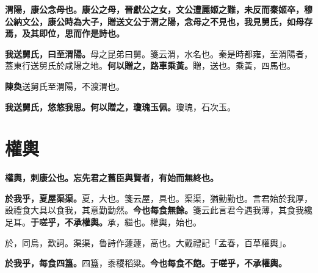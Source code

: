 
\textbf{渭陽，康公念母也。康公之母，晉獻公之女，文公遭麗姬之難，未反而秦姬卒，穆公納文公，康公時為大子，贈送文公于渭之陽，念母之不見也，我見舅氏，如母存焉，及其即位，思而作是詩也。}

\textbf{我送舅氏，曰至渭陽。}{\footnotesize 母之昆弟曰舅。箋云渭，水名也。秦是時都雍，至渭陽者，蓋東行送舅氏於咸陽之地。}\textbf{何以贈之，路車乘黃。}{\footnotesize 贈，送也。乘黃，四馬也。}

\begin{quoting}\textbf{陳奐}送舅氏至渭陽，不渡渭也。\end{quoting}

\textbf{我送舅氏，悠悠我思。何以贈之，瓊瑰玉佩。}{\footnotesize 瓊瑰，石次玉。}

\section{權輿}


\textbf{權輿，刺康公也。忘先君之舊臣與賢者，有始而無終也。}

\textbf{於我乎，夏屋渠渠。}{\footnotesize 夏，大也。箋云屋，具也。渠渠，猶勤勤也。言君始於我厚，設禮食大具以食我，其意勤勤然。}\textbf{今也每食無餘。}{\footnotesize 箋云此言君今遇我薄，其食我纔足耳。}\textbf{于嗟乎，不承權輿。}{\footnotesize 承，繼也。權輿，始也。}

\begin{quoting}於，同烏，歎詞。渠渠，魯詩作蘧蘧，高也。大戴禮記「孟春，百草權輿」。\end{quoting}

\textbf{於我乎，每食四簋。}{\footnotesize 四簋，黍稷稻粱。}\textbf{今也每食不飽。于嗟乎，不承權輿。}

